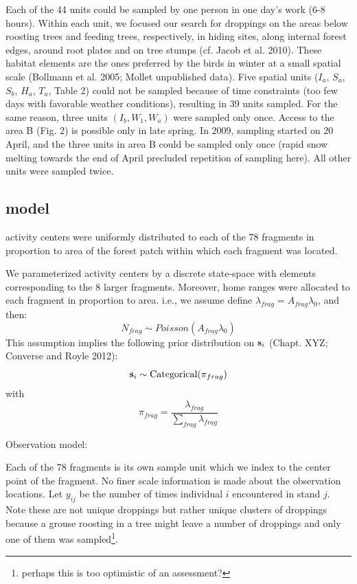 {Each of the 44 units
could be sampled by one person in
one day's work (6-8 hours). Within each unit, we focused our search
for droppings on the areas below roosting trees and feeding trees,
respectively, in hiding sites, along internal forest edges, around
root plates and on tree stumps (cf. Jacob et al. 2010). These habitat
elements are the ones preferred by the birds in winter at a small
spatial scale (Bollmann et al. 2005; Mollet unpublished data).
Five spatial units ($I_a$, $S_a$, $S_b$, $H_a$, $T_a$, Table 2) could
not be sampled because of time constraints (too few days with
favorable weather conditions), resulting in 39 units sampled. For the
same reason, three units $(I_b, W_1, W_a)$ were sampled only
once. Access to the area B (Fig. 2) is possible only in late
spring. In 2009, sampling started on 20 April, and the three units in
area B could be sampled only once (rapid snow melting towards the end
of April precluded repetition of sampling here). All other units were
sampled twice.




\subsection{model}

activity centers were uniformly distributed to each of the 78
fragments in proportion to area of the forest patch within which each
fragment was located.


We parameterized activity centers by a discrete state-space with elements
corresponding to the 8 larger fragments. Moreover, home ranges were allocated
to each fragment in  proportion to area. i.e., we assume
define $\lambda_{frag} = A_{frag} \lambda_{0}$, and then:
\[
 N_{frag} \sim Poisson( A_{frag} \lambda_{0} )
\]
This assumption implies the following prior distribution on ${\bf s}_{i}$ (Chapt.
XYZ; Converse and Royle 2012):
\[
{\bf s}_{i} \sim  \mbox{Categorical}(  \pi_{frag} ) 
\]
with
\[ 
 \pi_{frag} = \frac{ \lambda_{frag} }{\sum_{frag} \lambda_{frag}}
\]


Observation model:  

Each of the 78 fragments is its own sample unit which we index to the
center point of the fragment. No finer scale information is made about
the observation locations. 
Let $y_{ij}$ be  the number of times individual $i$ encountered in stand $j$.
Note these are not unique droppings but rather unique clusters of
droppings because a grouse roosting in a tree might leave a number of
droppings and only one of them was sampled\footnote{perhaps this is
  too optimistic of an assessment?}. 








}
